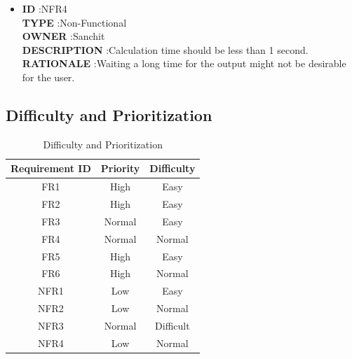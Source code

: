 \documentclass[a4paper,12pt]{article}
\begin{document}
\begin{itemize}
	
	\item \textbf{ID } \hspace{3cm} :NFR4  \\
	\textbf{TYPE } \hspace{2.27cm}  :Non-Functional\\
	\textbf{OWNER } \hspace{1.75cm} :Sanchit \\
	\textbf{DESCRIPTION }\hspace{0.35cm} :Calculation time should be less than 1 second. \\
	\textbf{RATIONALE } \hspace{0.75cm} :Waiting a long time for the output might not be desirable for the user.  \\
	
	
\end{itemize}


\subsection{Difficulty and Prioritization}


\begin{table}[htp]
	\centering
	\caption{Difficulty and Prioritization} \vspace{0.5cm} \label{tab:difficulty_table} 
	\begin{tabular}{||c|c|c||}
		\hline  \hline \textbf{Requirement ID} & \textbf{Priority} & \textbf{Difficulty} \\
		\hline \hline
		FR1 & High & Easy \\ 
		\hline
		FR2 & High & Easy \\ 
		\hline
		FR3 & Normal & Easy  \\ 
		\hline
		FR4 & Normal & Normal \\ 
		\hline
		FR5 & High & Easy  \\ 
		\hline
		FR6 & High & Normal \\ 
		\hline
		NFR1 & Low & Easy  \\ 
		\hline
		NFR2 & Low & Normal  \\ 
		\hline
		NFR3 & Normal & Difficult  \\ 
		\hline
		NFR4 & Low & Normal  \\ 
		\hline
	\end{tabular}
\end{table}
\end{document}
